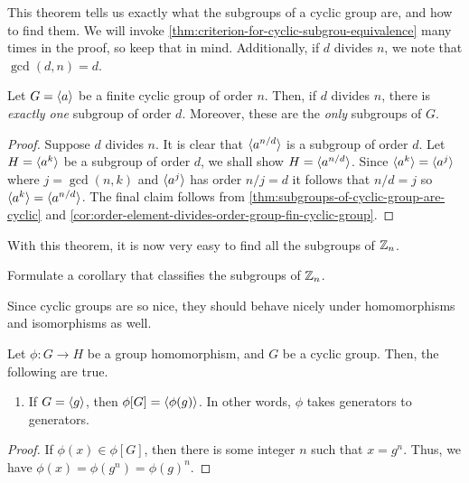 \documentclass[./algebra-notes.tex]{subfiles}
\begin{document}
This theorem tells us exactly what the subgroups of a cyclic group are, and how
to find them. We will invoke \cref{thm:criterion-for-cyclic-subgrou-equivalence}
many times in the proof, so keep that in mind. Additionally, if $d$ divides $n$,
we note that $\gcd(d,n) = d$.
\begin{theorem}
    Let $G = { \langle a \rangle }$ be a finite cyclic group of order $n$. Then, if $d$
    divides $n$, there is \emph{exactly one} subgroup of order $d$. Moreover,
    these are the \emph{only} subgroups of $G$.
\end{theorem}
\begin{proof}
    Suppose $d$ divides $n$. It is clear that ${ \langle a^{n/d} \rangle }$ is a subgroup of
    order $d$. Let $H = { \langle a^k \rangle }$ be a subgroup of order $d$, we shall show $H
    = { \langle a^{n/d} \rangle }$. Since ${ \langle a^k \rangle } = { \langle a^j \rangle }$ where $j = \gcd(n, k)$ and
    ${ \langle a^j \rangle }$ has order $n/j = d$ it follows that $n/d=j$ so ${ \langle a^k \rangle } =
    { \langle a^{n/d} \rangle }$. The final claim follows from
    \cref{thm:subgroups-of-cyclic-group-are-cyclic} and
    \cref{cor:order-element-divides-order-group-fin-cyclic-group}.
\end{proof}

With this theorem, it is now very easy to find all the subgroups of $\mathbb{Z}_n$.
\begin{exercise}
    Formulate a corollary that classifies the subgroups of $\mathbb{Z}_n$.
\end{exercise}

Since cyclic groups are so nice, they should behave nicely under homomorphisms
and isomorphisms as well. 
\begin{proposition}
\label{prop:cyclic-group-properties-homomorphisms}
    Let $\phi: G \to H$ be a group homomorphism, and $G$ be a cyclic group.
    Then, the following are true. 
    \begin{enumerate}
        \item If $G = { \langle g \rangle }$, then $\phi[G] = { \langle \phi(g) \rangle }$. In other words,
        $\phi$ takes generators to generators.
    \end{enumerate}
\end{proposition}

\begin{proof}
    If $\phi(x) \in \phi[G]$, then there is some integer $n$ such that $x =
    g^n$. Thus, we have $\phi(x) = \phi(g^n) = \phi(g)^n$. 
\end{proof}
\end{document}
